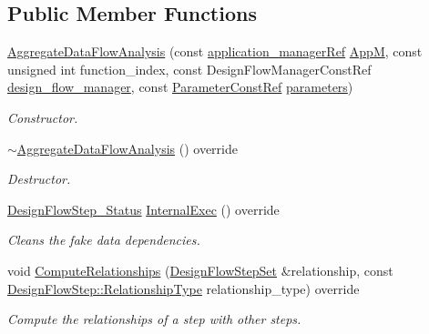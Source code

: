 \subsection*{Public Member Functions}
\begin{DoxyCompactItemize}
\item 
\hyperlink{classAggregateDataFlowAnalysis_a11a94cf943d80f0fefafbf8b91e72b20}{Aggregate\+Data\+Flow\+Analysis} (const \hyperlink{application__manager_8hpp_a04ccad4e5ee401e8934306672082c180}{application\+\_\+manager\+Ref} \hyperlink{classFrontendFlowStep_a0ac0d8db2a378416583f51c4faa59d15}{AppM}, const unsigned int function\+\_\+index, const Design\+Flow\+Manager\+Const\+Ref \hyperlink{classDesignFlowStep_ab770677ddf087613add30024e16a5554}{design\+\_\+flow\+\_\+manager}, const \hyperlink{Parameter_8hpp_a37841774a6fcb479b597fdf8955eb4ea}{Parameter\+Const\+Ref} \hyperlink{classDesignFlowStep_a802eaafe8013df706370679d1a436949}{parameters})
\begin{DoxyCompactList}\small\item\em Constructor. \end{DoxyCompactList}\item 
\hyperlink{classAggregateDataFlowAnalysis_a4453b6eb3f34f327462b40fe1d83e0d9}{$\sim$\+Aggregate\+Data\+Flow\+Analysis} () override
\begin{DoxyCompactList}\small\item\em Destructor. \end{DoxyCompactList}\item 
\hyperlink{design__flow__step_8hpp_afb1f0d73069c26076b8d31dbc8ebecdf}{Design\+Flow\+Step\+\_\+\+Status} \hyperlink{classAggregateDataFlowAnalysis_a691e72b5bd3dc3ad14a003b89d242628}{Internal\+Exec} () override
\begin{DoxyCompactList}\small\item\em Cleans the fake data dependencies. \end{DoxyCompactList}\item 
void \hyperlink{classAggregateDataFlowAnalysis_aa387e9bcfac9ad1ac7bab7b5b94f19fd}{Compute\+Relationships} (\hyperlink{classDesignFlowStepSet}{Design\+Flow\+Step\+Set} \&relationship, const \hyperlink{classDesignFlowStep_a723a3baf19ff2ceb77bc13e099d0b1b7}{Design\+Flow\+Step\+::\+Relationship\+Type} relationship\+\_\+type) override
\begin{DoxyCompactList}\small\item\em Compute the relationships of a step with other steps. \end{DoxyCompactList}\end{DoxyCompactItemize}
